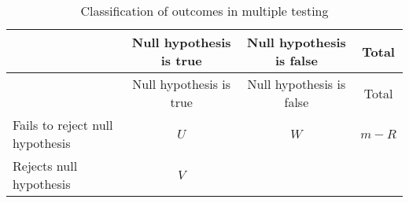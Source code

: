 \documentclass[
]{book}
\begin{document}
\begin{longtable}[]{@{}lccc@{}}
\caption{\label{tab:multipletesting} Classification of outcomes in multiple testing}\tabularnewline
\toprule
\begin{minipage}[b]{0.31\columnwidth}\raggedright
\strut
\end{minipage} & \begin{minipage}[b]{0.24\columnwidth}\centering
Null hypothesis is true\strut
\end{minipage} & \begin{minipage}[b]{0.25\columnwidth}\centering
Null hypothesis is false\strut
\end{minipage} & \begin{minipage}[b]{0.08\columnwidth}\centering
Total\strut
\end{minipage}\tabularnewline
\midrule
\endfirsthead
\toprule
\begin{minipage}[b]{0.31\columnwidth}\raggedright
\strut
\end{minipage} & \begin{minipage}[b]{0.24\columnwidth}\centering
Null hypothesis is true\strut
\end{minipage} & \begin{minipage}[b]{0.25\columnwidth}\centering
Null hypothesis is false\strut
\end{minipage} & \begin{minipage}[b]{0.08\columnwidth}\centering
Total\strut
\end{minipage}\tabularnewline
\midrule
\endhead
\begin{minipage}[t]{0.31\columnwidth}\raggedright
Fails to reject null hypothesis\strut
\end{minipage} & \begin{minipage}[t]{0.24\columnwidth}\centering
\(U\)\strut
\end{minipage} & \begin{minipage}[t]{0.25\columnwidth}\centering
\(W\)\strut
\end{minipage} & \begin{minipage}[t]{0.08\columnwidth}\centering
\(m - R\)\strut
\end{minipage}\tabularnewline
\begin{minipage}[t]{0.31\columnwidth}\raggedright
Rejects null hypothesis\strut
\end{minipage} & \begin{minipage}[t]{0.24\columnwidth}\centering
\(V\)\strut
\end{minipage} & \begin{minipage}[t]{0.25\columnwidth}\centering

\end{minipage}
\end{longtable}
\end{document}
